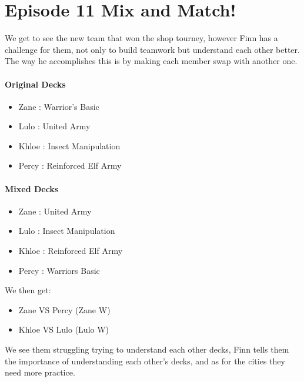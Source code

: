 \documentclass[12pt, letterpaper]{article}
\begin{document}
\section*{Episode 11 Mix and Match!}
\par We get to see the new team that won the shop tourney, however Finn has a challenge for them, 
not only to build teamwork but understand each other better. The way he accomplishes this is by 
making each member swap with another one.

\paragraph{Original Decks}
\begin{itemize}
   \item Zane : Warrior’s Basic
   \item Lulo : United Army
   \item Khloe : Insect Manipulation
   \item Percy : Reinforced Elf Army
\end{itemize}
\paragraph{Mixed Decks}
\begin{itemize}
   \item Zane : United Army
   \item Lulo : Insect Manipulation
   \item Khloe : Reinforced Elf Army
   \item Percy : Warriors Basic
\end{itemize}
\par We then get:
\begin{itemize}
   \item Zane VS Percy (Zane W)
   \item Khloe VS Lulo (Lulo W)
\end{itemize}
\par We see them struggling trying to understand each other decks, Finn tells them the importance of 
understanding each other’s decks, and as for the cities they need more practice.
\end{document}
